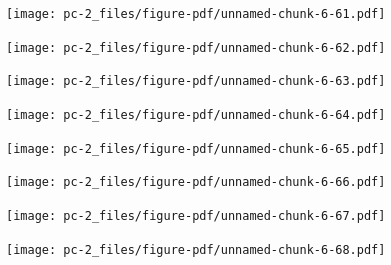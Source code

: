 \documentclass[
  letterpaper,
  DIV=11,
  numbers=noendperiod]{scrreprt}
\begin{document}
\begin{figure}[H]

{\centering \texttt{[image: pc-2\_files/figure-pdf/unnamed-chunk-6-61.pdf]}

}

\end{figure}

\begin{figure}[H]

{\centering \texttt{[image: pc-2\_files/figure-pdf/unnamed-chunk-6-62.pdf]}

}

\end{figure}

\begin{figure}[H]

{\centering \texttt{[image: pc-2\_files/figure-pdf/unnamed-chunk-6-63.pdf]}

}

\end{figure}

\begin{figure}[H]

{\centering \texttt{[image: pc-2\_files/figure-pdf/unnamed-chunk-6-64.pdf]}

}

\end{figure}

\begin{figure}[H]

{\centering \texttt{[image: pc-2\_files/figure-pdf/unnamed-chunk-6-65.pdf]}

}

\end{figure}

\begin{figure}[H]

{\centering \texttt{[image: pc-2\_files/figure-pdf/unnamed-chunk-6-66.pdf]}

}

\end{figure}

\begin{figure}[H]

{\centering \texttt{[image: pc-2\_files/figure-pdf/unnamed-chunk-6-67.pdf]}

}

\end{figure}

\begin{figure}[H]

{\centering \texttt{[image: pc-2\_files/figure-pdf/unnamed-chunk-6-68.pdf]}

}

\end{figure}
\end{document}
